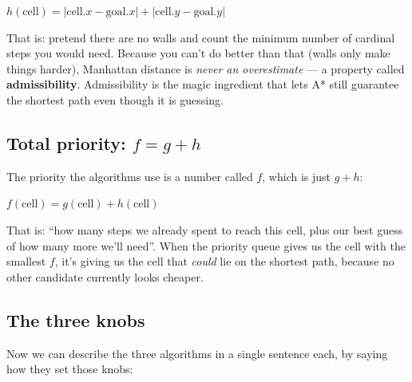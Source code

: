 \documentclass[11pt,a4paper]{article}
\newcommand{\gridbase}[2]{%
  \draw[step=0.6,gray!50,very thin] (0,0) grid (#1*0.6,#2*0.6);
  \draw[black,thick] (0,0) rectangle (#1*0.6,#2*0.6);
}
\newcommand{\fillcell}[3]{%
  \fill[#3] (#1*0.6,#2*0.6) rectangle ({(#1+1)*0.6},{(#2+1)*0.6});
  \draw[gray!50,very thin] (#1*0.6,#2*0.6) rectangle ({(#1+1)*0.6},{(#2+1)*0.6});
}
\newcommand{\celltext}[3]{%
  \node at ({(#1+0.5)*0.6},{(#2+0.5)*0.6}) {\footnotesize #3};
}
\begin{document}
\begin{center}
$h(\text{cell}) = |{\text{cell}.x - \text{goal}.x}| + |{\text{cell}.y - \text{goal}.y}|$
\end{center}

That is: pretend there are no walls and count the minimum number of cardinal steps you would need. Because you can't do better than that (walls only make things harder), Manhattan distance is \emph{never an overestimate} --- a property called \textbf{admissibility}. Admissibility is the magic ingredient that lets A* still guarantee the shortest path even though it is guessing.

\begin{center}
\end{center}

\subsection{Total priority: \texorpdfstring{$f = g + h$}{f = g + h}}

The priority the algorithms use is a number called $f$, which is just $g + h$:

\begin{center}
$f(\text{cell}) = g(\text{cell}) + h(\text{cell})$
\end{center}

\noindent That is: ``how many steps we already spent to reach this cell, plus our best guess of how many more we'll need''. When the priority queue gives us the cell with the smallest $f$, it's giving us the cell that \emph{could} lie on the shortest path, because no other candidate currently looks cheaper.

\subsection{The three knobs}

Now we can describe the three algorithms in a single sentence each, by saying how they set those knobs:
\end{document}
